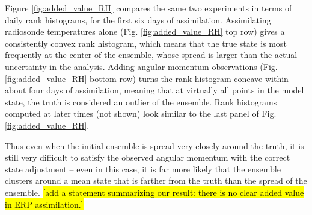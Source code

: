 Figure \ref{fig:added_value_RH} compares the same two experiments in terms of daily rank histograms, for the first six days of assimilation.  
Assimilating radiosonde temperatures alone (Fig. \ref{fig:added_value_RH} top row) gives a consistently convex rank histogram, which means that the true state is most frequently at the center of the ensemble, whose spread is larger than the actual uncertainty in the analysis.  
Adding angular momentum observations (Fig. \ref{fig:added_value_RH} bottom row) turns the rank histogram concave within about four days of assimilation, meaning that at virtually all points in the model state, the truth is considered an outlier of the ensemble. 
Rank histograms computed at later times (not shown) look similar to the last panel of Fig. \ref{fig:added_value_RH}.  

Thus even when the initial ensemble is spread very closely around the truth, it is still very difficult to satisfy the observed angular momentum with the correct state adjustment -- even in this case, it is far more likely that the ensemble clusters around a mean state that is farther from the truth than the spread of the ensemble.  
\hl{[add a statement summarizing our result: there is no clear added value in ERP assimilation.]}
